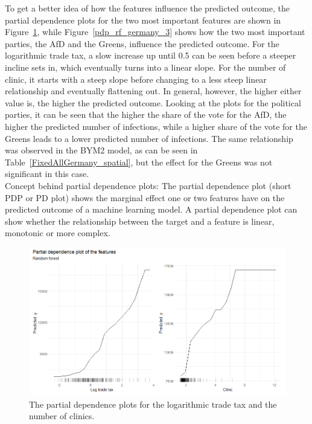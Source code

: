 To get a better idea of how the features influence the predicted outcome, the partial dependence plots for the two most important features are shown in Figure~\ref{pdp_rf_germany_1}, while Figure~\ref{pdp_rf_germany_3} shows how the two most important parties, the AfD and the Greens, influence the predicted outcome. For the logarithmic trade tax, a slow increase up until 0.5 can be seen before a steeper incline sets in, which eventually turns into a linear slope. For the number of clinic, it starts with a steep slope before changing to a less steep linear relationship and eventually flattening out. In general, however, the higher either value is, the higher the predicted outcome. Looking at the plots for the political parties, it can be seen that the higher the share of the vote for the AfD, the higher the predicted number of infections, while a higher share of the vote for the Greens leads to a lower predicted number of infections. The same relationship was observed in the BYM2 model, as can be seen in Table~\ref{FixedAllGermany_spatial}, but the effect for the Greens was not significant in this case. \\
Concept behind partial dependence plots:
The partial dependence plot (short PDP or PD plot) shows the marginal effect one or two features have on the predicted outcome of a machine learning model. A partial dependence plot can show whether the relationship between the target and a feature is linear, monotonic or more complex.
\begin{figure}[H]
  \centering
  \includegraphics[width = \textwidth]{pdp_rf_germany_1.png}
  \caption{The partial dependence plots for the logarithmic trade tax and the number of clinics.}
  \label{pdp_rf_germany_1}
\end{figure}
